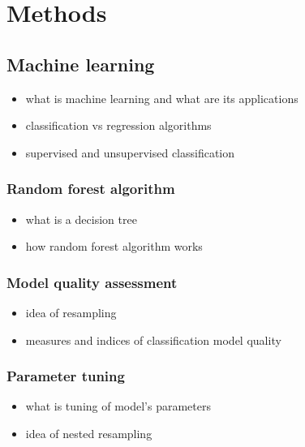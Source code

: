 \documentclass{amuthesis}
\begin{document}

\hypertarget{sec-methods}{%
\chapter{Methods}\label{sec-methods}}

\hypertarget{sec-ml}{%
\section{Machine learning}\label{sec-ml}}

\begin{itemize}
\item
  what is machine learning and what are its applications
\item
  classification vs regression algorithms
\item
  supervised and unsupervised classification
\end{itemize}

\hypertarget{sec-rf}{%
\subsection{Random forest algorithm}\label{sec-rf}}

\begin{itemize}
\item
  what is a decision tree
\item
  how random forest algorithm works
\end{itemize}

\hypertarget{sec-resampling}{%
\subsection{Model quality assessment}\label{sec-resampling}}

\begin{itemize}
\item
  idea of resampling
\item
  measures and indices of classification model quality
\end{itemize}

\hypertarget{sec-tuning}{%
\subsection{Parameter tuning}\label{sec-tuning}}

\begin{itemize}
\item
  what is tuning of model's parameters
\item
  idea of nested resampling
\end{itemize}
\end{document}
